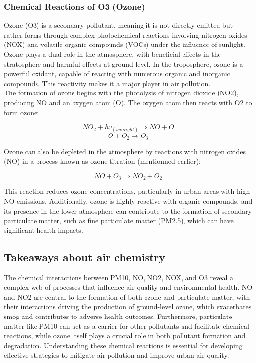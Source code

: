 \documentclass{modeleRapport}
\begin{document}
\subsubsection{Chemical Reactions of O3 (Ozone)}

Ozone (O3) is a secondary pollutant, meaning it is not directly emitted but rather forms through complex photochemical 
reactions involving nitrogen oxides (NOX) and volatile organic compounds (VOCs) under the influence of sunlight. Ozone 
plays a dual role in the atmosphere, with beneficial effects in the stratosphere and harmful effects at ground level. In the 
troposphere, ozone is a powerful oxidant, capable of reacting with numerous organic and inorganic compounds. This reactivity 
makes it a major player in air pollution.\\

The formation of ozone begins with the photolysis of nitrogen dioxide (NO2), producing NO and an oxygen atom (O). The 
oxygen atom then reacts with O2 to form ozone:

$$NO_2 + hv_{(sunlight)} \Rightarrow NO+O$$
$$O+O_2 \Rightarrow O_3$$

Ozone can also be depleted in the atmosphere by reactions with nitrogen oxides (NO) in a process known as ozone titration
(mentionned earlier):

$$NO + O_3 \Rightarrow NO_2 + O_2$$

This reaction reduces ozone concentrations, particularly in urban areas with high NO emissions. Additionally, ozone is 
highly reactive with organic compounds, and its presence in the lower atmosphere can contribute to the formation of 
secondary particulate matter, such as fine particulate matter (PM2.5), which can have significant health impacts.

\subsection{Takeaways about air chemistry}

The chemical interactions between PM10, NO, NO2, NOX, and O3 reveal a complex web of processes that influence air 
quality and environmental health. NO and NO2 are central to the formation of both ozone and particulate matter, with their 
interactions driving the production of ground-level ozone, which exacerbates smog and contributes to adverse health outcomes. 
Furthermore, particulate matter like PM10 can act as a carrier for other pollutants and facilitate chemical reactions, while 
ozone itself plays a crucial role in both pollutant formation and degradation. Understanding these chemical reactions is 
essential for developing effective strategies to mitigate air pollution and improve urban air quality.
\end{document}
